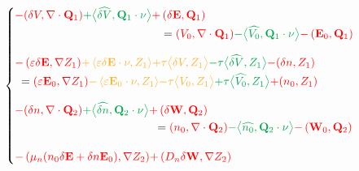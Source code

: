 \documentclass[a4paper,12pt, draft]{article}
\newcommand{\diver}[1]{\ensuremath{\nabla \cdot #1}}
\begin{document}
\begin{equation*}
 \begin{cases}
  \begin{aligned}
   {\color{red} -(\delta V, \diver{\mathbf{Q}_{1}})}
         {\color{Green} + \big<\widehat{\delta V}, \mathbf{Q}_{1} \cdot \nu \big>}
         {\color{red} + \left(\delta \mathbf{E}, \mathbf{Q}_{1} \right)} \\
       & \hspace{-39.5pt} = {\color{red} (V_0, \diver{\mathbf{Q}_{1}})}
           {\color{Green} - \big<\widehat{V_{0}}, \mathbf{Q}_{1} \cdot \nu \big>}
           {\color{red} - \left(\mathbf{E}_{0}, \mathbf{Q}_{1} \right)}
  \end{aligned} \\[20pt]
  \begin{aligned}
  {\color{red} - \left(\varepsilon\delta \mathbf{E}, \nabla Z_{1}\right)}
          {\color{Dandelion} + \left<\varepsilon  \delta \mathbf{E} \cdot \nu, Z_{1}\right>}
          {\color{Dandelion} + \tau \big< \delta V, Z_{1} \big>}
          {\color{Green} - \tau \big<\widehat{\delta V}, Z_{1} \big>}
          {\color{red} - ( \delta n , Z_{1})} \\
      & \hspace{-261pt}  = {\color{red} \left(\varepsilon \mathbf{E}_{0}, \nabla Z_{1}\right)}
          {\color{Dandelion} - \left<\varepsilon \mathbf{E}_{0} \cdot \nu, Z_{1}\right>}
          {\color{Dandelion} - \tau \big< V_{0}, Z_{1} \big>}
          {\color{Green} + \tau \big<\widehat{V_{0}}, Z_{1} \big>}
          {\color{red} + (n_{0}, Z_{1})}
  \end{aligned} \\[20pt]
    \begin{aligned}
  {\color{red} -(\delta n, \diver{\mathbf{Q}_{2}})}
          {\color{Green} + \big<\widehat{\delta n}, \mathbf{Q}_{2} \cdot \nu \big>}
          {\color{red} + \left(\delta \mathbf{W}, \mathbf{Q}_{2} \right)} \\
      & \hspace{-47pt} = {\color{red} (n_0, \diver{\mathbf{Q}_{2}})}
          {\color{Green} - \big<\widehat{n_{0}}, \mathbf{Q}_{2} \cdot \nu \big>}
          {\color{red} - \left(\mathbf{W}_{0}, \mathbf{Q}_{2} \right)}
  \end{aligned} \\[20pt]
  \begin{aligned}
  {\color{red}-\left(\mu_n(n_{0}\delta\mathbf{E} + \delta n \mathbf{E}_{0}), \nabla Z_{2}\right)}
          {\color{red} + \left( D_n  \delta \mathbf{W}, \nabla Z_{2} \right)}

\end{aligned}
\end{cases}
\end{equation*}
\end{document}
